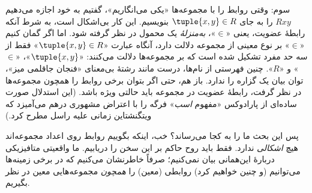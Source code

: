 \documentclass[../../../include/open-logic-section]{subfiles}
\begin{document}
سوم: وقتی روابط را با مجموعه‌ها «یکی می‌انگاریم»، گفتیم به خود اجازه
می‌دهیم $Rxy$ را به جای $\tuple{x,y} \in R$ بنویسیم. این کار بی‌اشکال
است، به شرط آنکه رابطهٔ عضویت، یعنی «$\in$»، \emph{به‌منزلهٔ} یک محمول
در نظر گرفته شود. اما اگر گمان کنیم «$\in$» بر نوع معینی از مجموعه
دلالت دارد، آنگاه عبارت «$\tuple{x,y} \in R$» فقط از سه حد مفرد تشکیل
شده است که بر مجموعه‌ها دلالت می‌کنند: «$\tuple{x,y}$»، «$\in$» و
«$R$». چنین فهرستی از نام‌ها، درست مانند رشتهٔ بی‌معنای «فنجان جاقلمی
میز»، توان بیان یک گزاره را ندارد. باز هم، حتی اگر بتوان برخی روابط را همچون
مجموعه‌ها در نظر گرفت، رابطهٔ عضویت در مجموعه باید حالتی ویژه باشد.
(این استدلال صورت ساده‌ای از پارادوکس «مفهوم \emph{اسب}» فرگه را با
اعتراض مشهوری درهم می‌آمیزد که ویتگنشتاین زمانی علیه راسل مطرح کرد.)

پس این بحث ما را به کجا می‌رساند؟ خب، اینکه بگوییم روابط روی اعداد
مجموعه‌اند هیچ \emph{اشکالی} ندارد. فقط باید روح حاکم بر این سخن را
دریابیم. ما واقعیتی متافیزیکی دربارهٔ این‌همانی بیان نمی‌کنیم؛ صرفاً
خاطرنشان می‌کنیم که در برخی زمینه‌ها می‌توانیم (و چنین خواهیم کرد)
روابطی (معین) را \emph{همچون} مجموعه‌هایی معین در نظر بگیریم.
\end{document}
